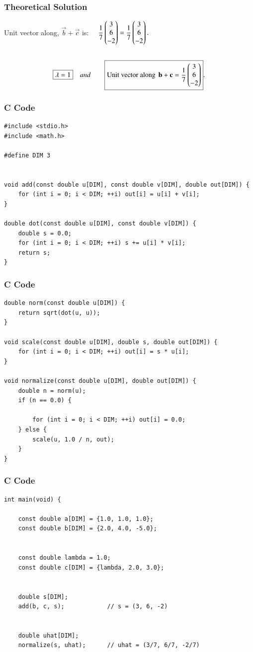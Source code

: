 \documentclass{beamer}
\begin{document}
\begin{frame}[fragile]
    \frametitle{Theoretical Solution}
Unit vector along, $\vec{b}+\vec{c}$ is: $\quad \dfrac{1}{7}\begin{pmatrix}3\\6\\-2\end{pmatrix}
= \dfrac{1}{7}\begin{pmatrix}3\\6\\-2\end{pmatrix}.$\\\\
\bigskip
\begin{align}   
\centering
\boxed{\lambda=1} \quad and \qquad 
\boxed{\text{Unit vector along }\,\vec{b}+\vec{c}
=\dfrac{1}{7}\myvec{3\\6\\-2}}.
\end{align}
\end{frame}


\begin{frame}[fragile]
    \frametitle{C Code}
    \begin{lstlisting}
#include <stdio.h>
#include <math.h>

#define DIM 3


void add(const double u[DIM], const double v[DIM], double out[DIM]) {
    for (int i = 0; i < DIM; ++i) out[i] = u[i] + v[i];
}

double dot(const double u[DIM], const double v[DIM]) {
    double s = 0.0;
    for (int i = 0; i < DIM; ++i) s += u[i] * v[i];
    return s;
}
    \end{lstlisting}
\end{frame}


\begin{frame}[fragile]
    \frametitle{C Code}
    \begin{lstlisting}
double norm(const double u[DIM]) {
    return sqrt(dot(u, u));
}

void scale(const double u[DIM], double s, double out[DIM]) {
    for (int i = 0; i < DIM; ++i) out[i] = s * u[i];
}

void normalize(const double u[DIM], double out[DIM]) {
    double n = norm(u);
    if (n == 0.0) {
         
        for (int i = 0; i < DIM; ++i) out[i] = 0.0;
    } else {
        scale(u, 1.0 / n, out);
    }
}
    \end{lstlisting}
\end{frame}


\begin{frame}[fragile]
    \frametitle{C Code}
    \begin{lstlisting}
int main(void) {
    
    const double a[DIM] = {1.0, 1.0, 1.0};
    const double b[DIM] = {2.0, 4.0, -5.0};

    
    const double lambda = 1.0;
    const double c[DIM] = {lambda, 2.0, 3.0};

    
    double s[DIM];
    add(b, c, s);            // s = (3, 6, -2)

    
    double uhat[DIM];
    normalize(s, uhat);      // uhat = (3/7, 6/7, -2/7)

    

    \end{lstlisting}
\end{frame}
\end{document}
